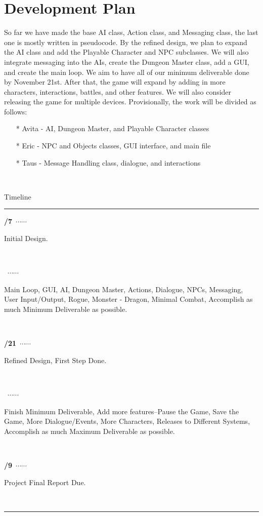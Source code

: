 \documentclass{article}
\newcommand\ytl[2]{
\parbox[b]{8em}{\hfill{\color{cyan}\bfseries\sffamily #1}~$\cdots\cdots$~}\makebox[0pt][c]{$\bullet$}\vrule\quad \parbox[c]{4.5cm}{\vspace{7pt}\color{red!40!black!80}\raggedright\sffamily #2.\\[7pt]}\\[-3pt]}
\theoremstyle{definition}
\begin{document}
\section*{Development Plan}
So far we have made the base AI class, Action class, and Messaging class, the last
one is mostly written in pseudocode. By the refined design, we plan to expand the
AI class and add the Playable Character and NPC subclasses. We will also integrate
messaging into the AIs, create the Dungeon Master class, add a GUI, and create the
main loop. We aim to have all of our minimum deliverable done by November 21st. 
After that, the game will expand by adding in more characters, interactions, battles, and other features. We will also consider releasing the game for multiple
devices. Provisionally, the work will be divided as follows: 
\begin{enumerate}
\item[*] Avita - AI, Dungeon Master, and Playable Character classes
\item[*] Eric - NPC and Objects classes, GUI interface, and main file
\item[*] Taus - Message Handling class, dialogue, and interactions
\end{enumerate} \\


\begin{table}
\caption{Timeline}
\centering
\begin{minipage}[t]{.7\linewidth}
\color{gray}
\rule{\linewidth}{1pt}
\ytl{11/7}{Initial Design}
\ytl{}{Main Loop, GUI, AI, Dungeon Master, Actions, Dialogue, NPCs, Messaging, 
       User Input/Output, Rogue, Monster - Dragon, Minimal Combat, Accomplish
       as much Minimum Deliverable as possible}
\ytl{11/21}{Refined Design, First Step Done}
\ytl{}{Finish Minimum Deliverable, Add more features--Pause the Game, Save the Game, More Dialogue/Events,
       More Characters, Releases to Different Systems, Accomplish as much
       Maximum Deliverable as possible}
\ytl{12/9}{Project Final Report Due}
\bigskip
\rule{\linewidth}{1pt}%
\end{minipage}%
\end{table}
\end{document}
